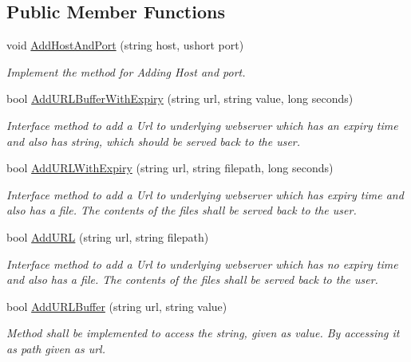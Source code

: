 \subsection*{Public Member Functions}
\begin{DoxyCompactItemize}
\item 
void \mbox{\hyperlink{interface_concord_1_1_c3_http_module_1_1_i_web_server_aa89c81f517e7081af15505ef4d5a7083}{Add\+Host\+And\+Port}} (string host, ushort port)
\begin{DoxyCompactList}\small\item\em Implement the method for Adding Host and port. \end{DoxyCompactList}\item 
bool \mbox{\hyperlink{interface_concord_1_1_c3_http_module_1_1_i_web_server_a5d036cb1c423339e820d0ea7beae0319}{Add\+U\+R\+L\+Buffer\+With\+Expiry}} (string url, string value, long seconds)
\begin{DoxyCompactList}\small\item\em Interface method to add a Url to underlying webserver which has an expiry time and also has string, which should be served back to the user. \end{DoxyCompactList}\item 
bool \mbox{\hyperlink{interface_concord_1_1_c3_http_module_1_1_i_web_server_a7a04a9fca3a8f948c62d0fd7c6ca8220}{Add\+U\+R\+L\+With\+Expiry}} (string url, string filepath, long seconds)
\begin{DoxyCompactList}\small\item\em Interface method to add a Url to underlying webserver which has expiry time and also has a file. The contents of the files shall be served back to the user. \end{DoxyCompactList}\item 
bool \mbox{\hyperlink{interface_concord_1_1_c3_http_module_1_1_i_web_server_a4ebea56f3b1910ddf812d80045dbc6f2}{Add\+U\+RL}} (string url, string filepath)
\begin{DoxyCompactList}\small\item\em Interface method to add a Url to underlying webserver which has no expiry time and also has a file. The contents of the files shall be served back to the user. \end{DoxyCompactList}\item 
bool \mbox{\hyperlink{interface_concord_1_1_c3_http_module_1_1_i_web_server_a9a176bd109854beffd146dfef15a276a}{Add\+U\+R\+L\+Buffer}} (string url, string value)
\begin{DoxyCompactList}\small\item\em Method shall be implemented to access the string, given as value. By accessing it as path given as url. \end{DoxyCompactList}\item 

\end{DoxyCompactItemize}
